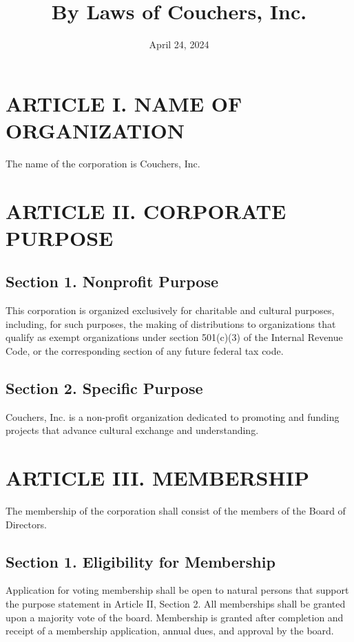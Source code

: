 \documentclass[a4paper]{article}
\begin{document}
\title{By Laws of Couchers, Inc.}
\date{April 24, 2024}
\maketitle

\section*{ARTICLE I. NAME OF ORGANIZATION}

The name of the corporation is Couchers, Inc.

\section*{ARTICLE II. CORPORATE PURPOSE}


\subsection*{Section 1. Nonprofit Purpose}

This corporation is organized exclusively for charitable and cultural purposes, including, for such purposes, the making of distributions to organizations that qualify as exempt organizations under section 501(c)(3) of the Internal Revenue Code, or the corresponding section of any future federal tax code.

\subsection*{Section 2. Specific Purpose}

Couchers, Inc. is a non-profit organization dedicated to promoting and funding projects that advance cultural exchange and understanding.

\section*{ARTICLE III. MEMBERSHIP}

The membership of the corporation shall consist of the members of the Board of Directors.

\subsection*{Section 1. Eligibility for Membership}

Application for voting membership shall be open to natural persons that support the purpose statement in Article II, Section 2. All memberships shall be granted upon a majority vote of the board. Membership is granted after completion and receipt of a membership application, annual dues, and approval by the board.
\end{document}
